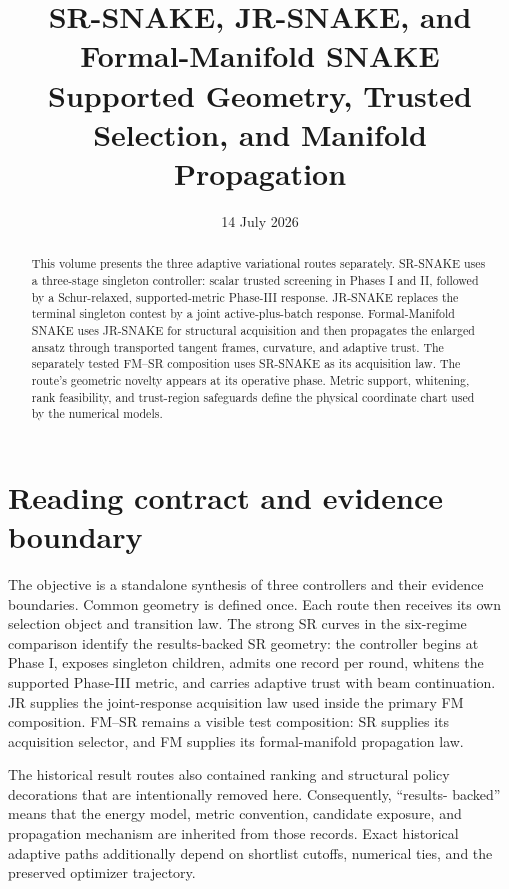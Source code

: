\documentclass[10pt,twocolumn]{article}
\title{SR-SNAKE, JR-SNAKE, and Formal-Manifold SNAKE\\
\large Supported Geometry, Trusted Selection, and Manifold Propagation}
\author{}
\date{14 July 2026}
\begin{document}
\maketitle
\vspace{-1.5em}

\begin{abstract}
This volume presents the three adaptive variational routes separately.
SR-SNAKE uses a three-stage singleton controller: scalar trusted screening in
Phases I and II, followed by a Schur-relaxed, supported-metric Phase-III
response. JR-SNAKE replaces the terminal singleton contest by a joint
active-plus-batch response. Formal-Manifold SNAKE uses JR-SNAKE for structural
acquisition and then propagates the enlarged ansatz through transported tangent
frames, curvature, and adaptive trust. The separately tested FM--SR
composition uses SR-SNAKE as its acquisition law. The route's geometric novelty
appears at its operative phase. Metric support, whitening, rank feasibility,
and trust-region safeguards define the physical coordinate chart used by the
numerical models.
\end{abstract}

\section*{Reading contract and evidence boundary}

The objective is a standalone synthesis of three controllers and their evidence
boundaries. Common geometry is defined once. Each route then receives its own
selection object and transition law. The strong SR curves in the six-regime
comparison identify the
results-backed SR geometry: the controller begins at Phase I, exposes singleton
children, admits one record per round, whitens the supported Phase-III metric,
and carries adaptive trust with beam continuation.
JR supplies the joint-response acquisition law used inside the primary FM
composition. FM--SR remains a visible test composition: SR supplies its
acquisition selector, and FM supplies its formal-manifold propagation law.

The historical result routes also contained ranking and structural policy
decorations that are intentionally removed here. Consequently, ``results-
backed'' means that the energy model, metric convention, candidate exposure,
and propagation mechanism are inherited from those records. Exact historical
adaptive paths additionally depend on shortlist cutoffs, numerical ties, and
the preserved optimizer trajectory.
\end{document}
